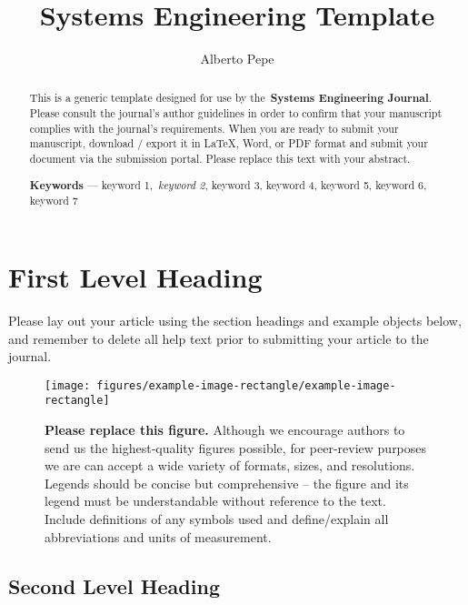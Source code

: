 \documentclass[alpha-refs]{wiley-article}
\title{Systems Engineering Template}
\author[1]{Alberto Pepe}
\affil[1]{Authorea}
\begin{document}
\maketitle
{}
\begin{abstract}
This is a generic template designed for use by the~\textbf{Systems
Engineering Journal}. Please consult the journal's author guidelines in
order to confirm that your manuscript complies with the journal's
requirements. When you are ready to submit your manuscript, download /
export it in LaTeX, Word, or PDF format and submit your document via the
submission portal. Please replace this text with your abstract.

\textbf{Keywords} --- keyword 1,~\emph{keyword 2}, keyword 3, keyword 4,
keyword 5, keyword 6, keyword 7%
\end{abstract}%




\section*{First Level Heading}

{\label{707961}}

Please lay out your article using the section headings and example
objects below, and remember to delete all help text prior to submitting
your article to the journal.
\begin{figure}[h!]
\begin{center}
\texttt{[image: figures/example-image-rectangle/example-image-rectangle]}
\caption{{\textbf{Please replace this figure.} Although we encourage authors to
send us the highest-quality figures possible, for peer-review purposes
we are can accept a wide variety of formats, sizes, and resolutions.
Legends should be concise but comprehensive -- the figure and its legend
must be understandable without reference to the text. Include
definitions of any symbols used and define/explain all abbreviations and
units of measurement.
{\label{div-126281}}%
}}
\end{center}
\end{figure}

\par\null

\subsection*{Second Level Heading}\label{second-level-heading}
\end{document}
